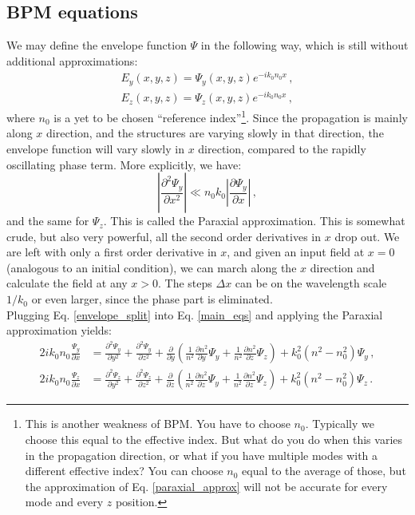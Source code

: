 \documentclass[]{article}
\begin{document}
	\subsection{BPM equations}
	We may define the envelope function $\Psi$ in the following way, which is still without additional approximations:
	\begin{subequations}
		\begin{align}
			E_y(x,y,z) = \Psi_y(x,y,z) e^{-ik_0 n_0 x}\, ,\\
			E_z(x,y,z) = \Psi_z(x,y,z) e^{-ik_0 n_0 x}\, ,
		\end{align}
		\label{envelope_split}
	\end{subequations}
	where $n_0$ is a yet to be chosen ``reference index''\footnote{This is another weakness of BPM. You have to choose $n_0$. Typically we choose this equal to the effective index. But what do you do when this varies in the propagation direction, or what if you have multiple modes with a different effective index? You can choose $n_0$ equal to the average of those, but the approximation of Eq. \eqref{paraxial_approx} will not be accurate for every mode and every $z$ position.}. 
	Since the propagation is mainly along $x$ direction, and the structures are varying slowly in that direction, the envelope function will vary slowly in $x$ direction, compared to the rapidly oscillating phase term. More explicitly,
	we have:
	\begin{equation}
		\left|\frac{\partial^2 \Psi_y}{\partial x^2} \right| \ll n_0 k_0 \left| \frac{\partial \Psi_y}{\partial x} \right|\, ,
		\label{paraxial_approx}
	\end{equation}
	and the same for $\Psi_z$. This is called the Paraxial approximation. This is somewhat crude, but also very powerful, all the second order derivatives in $x$ drop out. We are left with only a first order derivative in $x$, and given an input field at $x=0$ (analogous to an initial condition), we can march along the $x$ direction and calculate the field at any $x>0$. The steps $\Delta x$ can be on the wavelength scale $1/k_0$ or even larger, since the phase part is eliminated.\\
	
	Plugging Eq. \eqref{envelope_split} into Eq. \eqref{main_eqs} and applying the Paraxial approximation yields:
	\begin{subequations}
		\begin{align}
			2i k_0 n_0 \frac{\Psi_y}{\partial x} &= \frac{\partial^2\Psi_y}{\partial y^2}+\frac{\partial^2\Psi_y}{\partial z^2}+\frac{\partial}{\partial y}\left(\frac{1}{n^2}\frac{\partial n^2}{\partial y} \Psi_y+\frac{1}{n^2}\frac{\partial n^2}{\partial z} \Psi_z \right)+k_0^2(n^2-n_0^2)\Psi_y \, ,\\
			2i k_0 n_0 \frac{\Psi_z}{\partial x} &= \frac{\partial^2\Psi_z}{\partial y^2}+\frac{\partial^2\Psi_z}{\partial z^2}+\frac{\partial}{\partial z}\left(\frac{1}{n^2}\frac{\partial n^2}{\partial z} \Psi_y+\frac{1}{n^2}\frac{\partial n^2}{\partial z} \Psi_z \right)+k_0^2(n^2-n_0^2)\Psi_z  \, .
		\end{align}
	\end{subequations}
	
\end{document}
